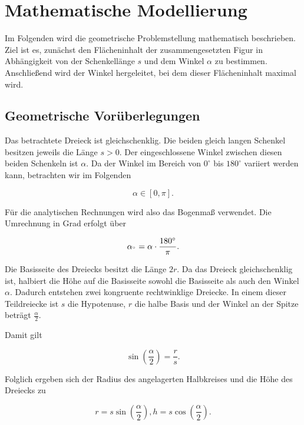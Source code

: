 \section{Mathematische Modellierung}

Im Folgenden wird die geometrische Problemstellung mathematisch beschrieben.
Ziel ist es, zunächst den Flächeninhalt der zusammengesetzten Figur in
Abhängigkeit von der Schenkellänge \(s\) und dem Winkel \(\alpha\) zu
bestimmen. Anschließend wird der Winkel hergeleitet, bei dem dieser
Flächeninhalt maximal wird.

\subsection{Geometrische Vorüberlegungen}

Das betrachtete Dreieck ist gleichschenklig. Die beiden gleich langen
Schenkel besitzen jeweils die Länge \(s>0\). Der eingeschlossene Winkel
zwischen diesen beiden Schenkeln ist \(\alpha\). Da der Winkel im Bereich
von \(0^\circ\) bis \(180^\circ\) variiert werden kann, betrachten wir im
Folgenden

\begin{equation}
    \alpha \in [0,\pi].
\end{equation}

Für die analytischen Rechnungen wird also das Bogenmaß verwendet. Die
Umrechnung in Grad erfolgt über

\begin{equation}
    \alpha_{\degree} = \alpha \cdot \frac{180^\circ}{\pi}.
\end{equation}

Die Basisseite des Dreiecks besitzt die Länge \(2r\). Da das Dreieck
gleichschenklig ist, halbiert die Höhe auf die Basisseite sowohl die
Basisseite als auch den Winkel \(\alpha\). Dadurch entstehen zwei
kongruente rechtwinklige Dreiecke. In einem dieser Teildreiecke ist \(s\)
die Hypotenuse, \(r\) die halbe Basis und der Winkel an der Spitze beträgt
\(\frac{\alpha}{2}\).

Damit gilt

\begin{equation}
    \sin\left(\frac{\alpha}{2}\right)
    =
    \frac{r}{s}.
\end{equation}

Folglich ergeben sich der Radius des angelagerten Halbkreises und die Höhe des Dreiecks zu

\begin{equation}
    r
    =
    s\sin\left(\frac{\alpha}{2}\right)
    ,
    h
    =
    s\cos\left(\frac{\alpha}{2}\right).
    \label{eq:radius_und_hoehe}
\end{equation}


